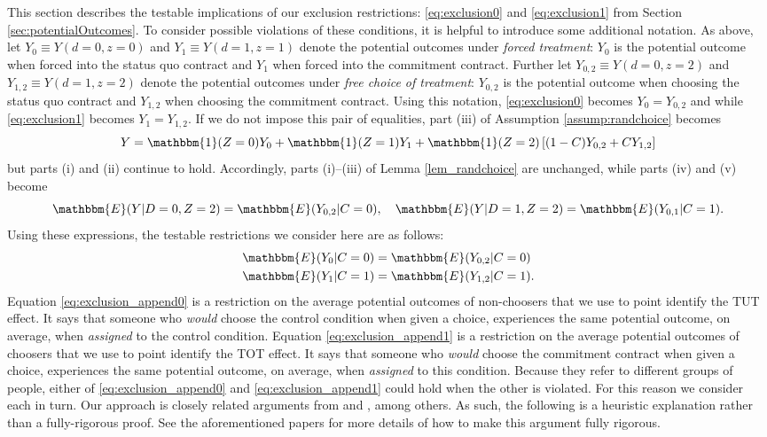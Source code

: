 This section describes the testable implications of our exclusion restrictions: \eqref{eq:exclusion0} and \eqref{eq:exclusion1} from Section \ref{sec:potentialOutcomes}. 
To consider possible violations of these conditions, it is helpful to introduce some additional notation.
As above, let $Y_0 \equiv Y(d=0,z=0)$ and $Y_1 \equiv Y(d=1,z=1)$ denote the potential outcomes under \emph{forced treatment}: $Y_0$ is the potential outcome when forced into the status quo contract and $Y_1$ when forced into the commitment contract. 
Further let $Y_{0,2} \equiv Y(d=0,z=2)$ and $Y_{1,2} \equiv Y(d=1,z=2)$ denote the potential outcomes under \emph{free choice of treatment}: $Y_{0,2}$ is the potential outcome when choosing the status quo contract and $Y_{1,2}$ when choosing the commitment contract. 
Using this notation, \eqref{eq:exclusion0} becomes $Y_0 = Y_{0,2}$ and while \eqref{eq:exclusion1} becomes $Y_1 = Y_{1,2}$.
If we do not impose this pair of equalities, part (iii) of Assumption \ref{assump:randchoice} becomes 
\[
Y = \mathbbm{1}(Z =0) Y_{0} + \mathbbm{1}(Z = 1)  Y_{1}  + \mathbbm{1}(Z = 2) \left[(1 - C) Y_{0,2} + C Y_{1,2} \right]
\]
but parts (i) and (ii) continue to hold.
Accordingly, parts (i)--(iii) of Lemma \ref{lem_randchoice} are unchanged, while parts (iv) and (v) become
\[
\mathbbm{E}(Y|D=0,Z=2) = \mathbbm{E}(Y_{0,2}|C=0), \quad
\mathbbm{E}(Y|D=1,Z=2) = \mathbbm{E}(Y_{0,1}|C=1).
\]
Using these expressions, the testable restrictions we consider here are as follows:
\begin{align}
\label{eq:exclusion_append0}
\mathbbm{E}(Y_0|C=0) &= \mathbbm{E}(Y_{0,2}|C=0) \\
\label{eq:exclusion_append1}
\mathbbm{E}(Y_1|C=1) &= \mathbbm{E}(Y_{1,2}|C=1).
\end{align}
Equation \ref{eq:exclusion_append0} is a restriction on the average potential outcomes of non-choosers that we use to point identify the TUT effect.
It says that someone who \emph{would} choose the control condition when given a choice, experiences the same potential outcome, on average, when \emph{assigned} to the control condition.
Equation \ref{eq:exclusion_append1} is a restriction on the average potential outcomes of choosers that we use to point identify the TOT effect.
It says that someone who \emph{would} choose the commitment contract when given a choice, experiences the same potential outcome, on average, when \emph{assigned} to this condition.
Because they refer to different groups of people, either of \eqref{eq:exclusion_append0}  and \eqref{eq:exclusion_append1} could hold when the other is violated.
For this reason we consider each in turn.
Our approach is closely related arguments from \cite{huber_mellace} and \cite{BinaryRegressor}, among others.
As such, the following is a heuristic explanation rather than a fully-rigorous proof.
See the aforementioned papers for more details of how to make this argument fully rigorous.

